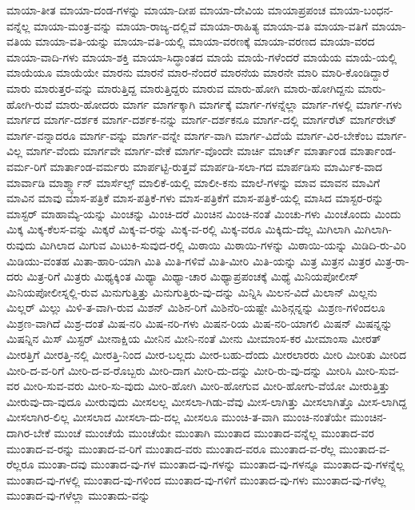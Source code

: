 {ಮಾಯಾ-ತೀತ
ಮಾಯಾ-ದಂಡ-ಗಳನ್ನು
ಮಾಯಾ-ದೀಪ
ಮಾಯಾ-ದೇವಿಯ
ಮಾಯಾಪ್ರಪಂಚ
ಮಾಯಾ-ಬಂಧನ-ವನ್ನೆಲ್ಲ
ಮಾಯಾ-ಮಂತ್ರ-ವನ್ನು
ಮಾಯಾ-ರಾಜ್ಯ-ದಲ್ಲಿವೆ
ಮಾಯಾ-ರಾಹಿತ್ಯ
ಮಾಯಾ-ವತಿ
ಮಾಯಾ-ವತಿಗೆ
ಮಾಯಾ-ವತಿಯ
ಮಾಯಾ-ವತಿ-ಯನ್ನು
ಮಾಯಾ-ವತಿ-ಯಲ್ಲಿ
ಮಾಯಾ-ವರಣಕ್ಕೆ
ಮಾಯಾ-ವರಣದ
ಮಾಯಾ-ವರದ
ಮಾಯಾ-ವಾದಿ-ಗಳು
ಮಾಯಾ-ಶಕ್ತಿ
ಮಾಯಾ-ಸಿದ್ಧಾಂತದ
ಮಾಯೆ
ಮಾಯೆ-ಗಳೆಂದರೆ
ಮಾಯೆಯ
ಮಾಯೆ-ಯಲ್ಲಿ
ಮಾಯೆಯೂ
ಮಾಯೆಯೇ
ಮಾರನು
ಮಾರನೆ
ಮಾರ-ನೆಂದರೆ
ಮಾರನೆಯ
ಮಾರನೇ
ಮಾರಿ
ಮಾರಿ-ಕೊಂಡಿದ್ದಾರೆ
ಮಾರು
ಮಾರುತ್ತರ-ವನ್ನು
ಮಾರುತ್ತಿದ್ದ
ಮಾರುತ್ತಿದ್ದರು
ಮಾರುವ
ಮಾರು-ಹೋಗಿ
ಮಾರು-ಹೋಗಿದ್ದನು
ಮಾರು-ಹೋಗಿ-ರುವೆ
ಮಾರು-ಹೋದರು
ಮಾರ್ಗ
ಮಾರ್ಗಕ್ಕಾಗಿ
ಮಾರ್ಗಕ್ಕೆ
ಮಾರ್ಗ-ಗಳನ್ನೆಲ್ಲಾ
ಮಾರ್ಗ-ಗಳಲ್ಲಿ
ಮಾರ್ಗ-ಗಳು
ಮಾರ್ಗದ
ಮಾರ್ಗ-ದರ್ಶಕ
ಮಾರ್ಗ-ದರ್ಶಕ-ನನ್ನು
ಮಾರ್ಗ-ದರ್ಶಕನೂ
ಮಾರ್ಗ-ದಲ್ಲಿ
ಮಾರ್ಗರೆಟ್
ಮಾರ್ಗರೇಟ್
ಮಾರ್ಗ-ವನ್ನಾದರೂ
ಮಾರ್ಗ-ವನ್ನು
ಮಾರ್ಗ-ವನ್ನೇ
ಮಾರ್ಗ-ವಾಗಿ
ಮಾರ್ಗ-ವಿದೆಯೆ
ಮಾರ್ಗ-ವಿರ-ಬೇಕೆಂಬ
ಮಾರ್ಗ-ವಿಲ್ಲ
ಮಾರ್ಗ-ವೆಂದು
ಮಾರ್ಗವೇ
ಮಾರ್ಗ-ವೇಕೆ
ಮಾರ್ಗ-ವೊಂದೇ
ಮಾರ್ಚಿ
ಮಾರ್ಚ್
ಮಾರ್ತಾಂಡ
ಮಾರ್ತಾಂಡ-ವರ್ಮ-ರಿಗೆ
ಮಾರ್ತಾಂಡ-ವರ್ಮರು
ಮಾರ್ಪಟ್ಟಿ-ರುತ್ತವೆ
ಮಾರ್ಪಡಿ-ಸಲಾ-ಗದ
ಮಾರ್ಪಡಿಸು
ಮಾರ್ಮಿಕ-ವಾದ
ಮಾರ್ವಾಡಿ
ಮಾರ್ಶ್ಮ್ಯಾನ್
ಮಾರ್ಸೆಲ್ಸ್
ಮಾಲಿಕೆ-ಯಲ್ಲಿ
ಮಾಲೀ-ಕನು
ಮಾಲೆ-ಗಳನ್ನು
ಮಾವ
ಮಾವನ
ಮಾವಿಗೆ
ಮಾವಿನ
ಮಾವು
ಮಾಸ-ಪತ್ರಿಕೆ
ಮಾಸ-ಪತ್ರಿಕೆ-ಗಳು
ಮಾಸ-ಪತ್ರಿಕೆಗೆ
ಮಾಸ-ಪತ್ರಿಕೆ-ಯಲ್ಲಿ
ಮಾಸಿದ
ಮಾಸ್ಟರ-ರನ್ನು
ಮಾಸ್ಟರ್
ಮಾಹಾಮ್ಯೆ-ಯನ್ನು
ಮಿಂಚನ್ನು
ಮಿಂಚಿ-ದರೆ
ಮಿಂಚಿನ
ಮಿಂಚಿ-ನಂತೆ
ಮಿಂಚು-ಗಳು
ಮಿಂಚೊಂದು
ಮಿಂದು
ಮಿಕ್ಕ
ಮಿಕ್ಕ-ಕೆಲಸ-ವನ್ನು
ಮಿಕ್ಕರೆ
ಮಿಕ್ಕ-ವ-ರನ್ನು
ಮಿಕ್ಕ-ವ-ರಲ್ಲಿ
ಮಿಕ್ಕ-ವರೂ
ಮಿಕ್ಕಿದು-ದೆಲ್ಲ
ಮಿಗಿಲಾಗಿ
ಮಿಗಿಲಾಗಿ-ರುವುದು
ಮಿಗಿಲಾದ
ಮಿಗುವ
ಮಿಟುಕಿ-ಸುವುದ-ರಲ್ಲಿ
ಮಿಠಾಯಿ
ಮಿಠಾಯಿ-ಗಳನ್ನು
ಮಿಠಾಯಿ-ಯನ್ನು
ಮಿಡಿದಿ-ರು-ವಿರಿ
ಮಿಡಿಯು-ವಂತಹ
ಮಿತಾ-ಹಾರಿ-ಯಾಗಿ
ಮಿತಿ
ಮಿತಿ-ಗಳಿವೆ
ಮಿತಿ-ಮೀರಿ
ಮಿತಿ-ಯನ್ನು
ಮಿತ್ರ
ಮಿತ್ರನ
ಮಿತ್ರರ
ಮಿತ್ರ-ರಾ-ದರು
ಮಿತ್ರ-ರಿಗೆ
ಮಿತ್ರರು
ಮಿಥ್ಯಕ್ಕಿಂತ
ಮಿಥ್ಯಾ
ಮಿಥ್ಯಾ-ಚಾರ
ಮಿಥ್ಯಾಪ್ರಪಂಚಕ್ಕೆ
ಮಿಥ್ಯೆ
ಮಿನಿಯಪೋಲೀಸ್
ಮಿನಿಯಪೋಲೀಸ್ನಲ್ಲಿ-ರುವ
ಮಿನುಗುತ್ತಿತ್ತು
ಮಿನುಗುತ್ತಿರು-ವು-ದನ್ನು
ಮಿನ್ನಿಸಿ
ಮಿಲನ-ವಿದೆ
ಮಿಲಾನ್
ಮಿಲ್ಲನು
ಮಿಲ್ಲರ್
ಮಿಲ್ಲು
ಮಿಳಿ-ತ-ವಾಗಿ-ರುವ
ಮಿಶನ್
ಮಿಶಿನ-ರಿಗೆ
ಮಿಶಿನೆರಿ-ಯಷ್ಟೇ
ಮಿಶಿನ್ಗನ್ನನ್ನು
ಮಿಶ್ರಣ-ಗಳಿಂದಲೂ
ಮಿಶ್ರಣ-ವಾಗಿದೆ
ಮಿಶ್ರ-ದಂತೆ
ಮಿಷ-ನರಿ
ಮಿಷ-ನರಿ-ಗಳು
ಮಿಷನ-ರಿಯ
ಮಿಷ-ನರಿ-ಯಾಗಲಿ
ಮಿಷನ್
ಮಿಷನ್ನನ್ನು
ಮಿಷನ್ನಿನ
ಮಿಸ್
ಮಿಸ್ಟರ್
ಮೀನಾಕ್ಷಿಯ
ಮೀನಿನ
ಮೀನಿ-ನಂತೆ
ಮೀನು
ಮೀಮಾಂಸ-ಕರ
ಮೀಮಾಂಸಾ
ಮೀರತ್
ಮೀರತ್ತಿಗೆ
ಮೀರತ್ತಿ-ನಲ್ಲಿ
ಮೀರತ್ತಿ-ನಿಂದ
ಮೀರ-ಬಲ್ಲದು
ಮೀರ-ಬಹು-ದೆಂದು
ಮೀರಲಾರರು
ಮೀರಿ
ಮೀರಿತು
ಮೀರಿದ
ಮೀರಿ-ದ-ವ-ರಿಗೆ
ಮೀರಿ-ದ-ವ-ರೊಬ್ಬರು
ಮೀರಿ-ದಾಗ
ಮೀರಿ-ದು-ದನ್ನು
ಮೀರಿ-ರು-ವು-ದನ್ನು
ಮೀರಿಸಿ
ಮೀರಿ-ಸುವ-ವರ
ಮೀರಿ-ಸುವ-ವರು
ಮೀರಿ-ಸು-ವುದು
ಮೀರಿ-ಹೋಗಿ
ಮೀರಿ-ಹೋಗುವ
ಮೀರಿ-ಹೋಗು-ವೆಯೋ
ಮೀರುತ್ತಿತ್ತು
ಮೀರುವು-ದಾ-ವುದೂ
ಮೀರುವುದು
ಮೀಸಲಲ್ಲ
ಮೀಸಲಾ-ಗಿಡು-ವೆವು
ಮೀಸ-ಲಾಗಿತ್ತು
ಮೀಸಲಾಗಿತ್ತೊ
ಮೀಸ-ಲಾಗಿದ್ದ
ಮೀಸಲಾಗಿರ-ಲಿಲ್ಲ
ಮೀಸಲಾದ
ಮೀಸಲಾ-ದು-ದಲ್ಲ
ಮೀಸಲೂ
ಮುಂಚಿ-ತ-ವಾಗಿ
ಮುಂಚಿ-ನಂತೆಯೇ
ಮುಂಚಿನ-ದಾಗಿರ-ಬೇಕೆ
ಮುಂಚೆ
ಮುಂಚೆಯೆ
ಮುಂಚೆಯೇ
ಮುಂತಾಗಿ
ಮುಂತಾದ
ಮುಂತಾದ-ವನ್ನೆಲ್ಲ
ಮುಂತಾದ-ವರ
ಮುಂತಾದ-ವ-ರನ್ನು
ಮುಂತಾದ-ವ-ರಿಗೆ
ಮುಂತಾದ-ವರು
ಮುಂತಾದ-ವರೂ
ಮುಂತಾದ-ವ-ರೆಲ್ಲ
ಮುಂತಾದ-ವ-ರೆಲ್ಲರೂ
ಮುಂತಾ-ದವು
ಮುಂತಾದ-ವು-ಗಳ
ಮುಂತಾದ-ವು-ಗಳನ್ನು
ಮುಂತಾದ-ವು-ಗಳನ್ನೂ
ಮುಂತಾದ-ವು-ಗಳನ್ನೆಲ್ಲ
ಮುಂತಾದ-ವು-ಗಳಲ್ಲಿ
ಮುಂತಾದ-ವು-ಗಳಿಂದ
ಮುಂತಾದ-ವು-ಗಳಿಗೆ
ಮುಂತಾದ-ವು-ಗಳು
ಮುಂತಾದ-ವು-ಗಳೆಲ್ಲ
ಮುಂತಾದ-ವು-ಗಳೆಲ್ಲಾ
ಮುಂತಾದು-ವನ್ನು
}
